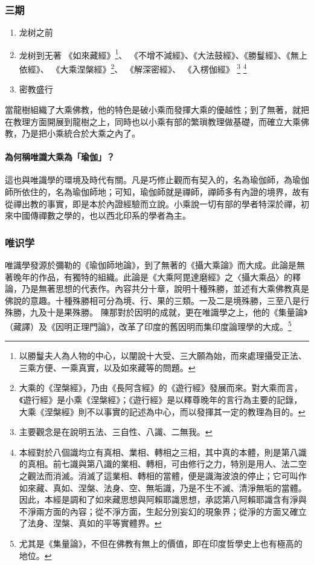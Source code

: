 \subsubsection{三期}
\begin{enumerate}
  \item 龙树之前
  \item 龙树到无著
    《如來藏經》\footnote{以勝鬘夫人為人物的中心，以闡說十大受、三大願為始，而來處理攝受正法、三乘方便、一乘真實，以及如來藏等的問題。}、
    《不增不減經》、《大法鼓經》、《勝鬘經》、《無上依經》、
    《大乘涅槃經》\footnote{大乘的《涅槃經》，乃由《長阿含經》的《遊行經》發展而來。對大乘而言，《遊行經》是小乘《涅槃經》；《遊行經》是以釋尊晚年的言行為主要的記錄，大乘《涅槃經》則不以事實的記述為中心，而以發揮其一定的教理為目的。}、
    《解深密經》、
    《入楞伽經》
    \footnote{主要觀念是在說明五法、三自性、八識、二無我。}
    \footnote{本經對於八個識均立有真相、業相、轉相之三相，其中真的本體，則是第八識的真相。前七識與第八識的業相、轉相，可由修行之力，特別是用人、法二空之觀法而消滅。消滅了這業相、轉相的當體，便是識海波浪的停止；它可叫作如來藏、真如、涅槃、法身、空、無垢識，乃是不生不滅、清淨無垢的當體。因此，本經是調和了如來藏思想與阿賴耶識思想，承認第八阿賴耶識含有淨與不淨兩方面的內容；從不淨方面，生起分別妄幻的現象界；從淨的方面又確立了法身、涅槃、真如的平等實體界。}
  \item 密教盛行
\end{enumerate}
當龍樹組織了大乘佛教，他的特色是破小乘而發揮大乘的優越性；到了無著，就把在教理方面開展到龍樹之上，同時也以小乘有部的繁瑣教理做基礎，而確立大乘佛教，乃是把小乘統合於大乘之內了。
\paragraph{為何稱唯識大乘為「瑜伽」？}這也與唯識學的環境及時代有關。凡是巧修止觀而有契入的，名為瑜伽師，為瑜伽師所依住的，名為瑜伽師地；可知，瑜伽師就是禪師，禪師多有內證的境界，故有從禪出教的事實，即是本於內證經驗而立說。小乘說一切有部的學者特深於禪，初來中國傳禪數之學的，也以西北印系的學者為主。

\subsubsection{唯识学}
唯識學發源於彌勒的《瑜伽師地論》，到了無著的《攝大乘論》而大成。此論是無著晚年的作品，有獨特的組織。此論是《大乘阿毘達磨經》之〈攝大乘品〉的釋論，乃是無著思想的代表作。內容共分十章，說明十種殊勝，並述有大乘佛教真是佛說的意趣。十種殊勝相可分為境、行、果的三類。一及二是境殊勝，三至八是行殊勝，九及十是果殊勝。
陳那對於因明的成就，更在唯識學之上，他的《集量論》（藏譯）及《因明正理門論》，改革了印度的舊因明而集印度論理學的大成。\footnote{尤其是《集量論》，不但在佛教有無上的價值，即在印度哲學史上也有極高的地位。}

